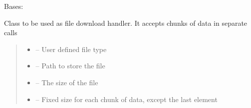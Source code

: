 \documentclass[letterpaper,10pt,english]{sphinxmanual}
\begin{document}
\begin{savenotes}\begin{fulllineitems}
\label{\detokenize{eezz:eezz.filesrv.TFile}}
\pysigstartsignatures
{}
\pysigstopsignatures
\sphinxAtStartPar
Bases: 

\sphinxAtStartPar
Class to be used as file download handler. It accepts chunks of data in separate calls
\begin{quote}\begin{description}
\begin{itemize}
\item {} 
\sphinxAtStartPar
{} – User defined file type

\item {} 
\sphinxAtStartPar
{} – Path to store the file

\item {} 
\sphinxAtStartPar
{} – The size of the file

\item {} 
\sphinxAtStartPar
{} – Fixed size for each chunk of data, except the last element

\end{itemize}

\end{description}\end{quote}


\end{fulllineitems}
\end{savenotes}
\end{document}
